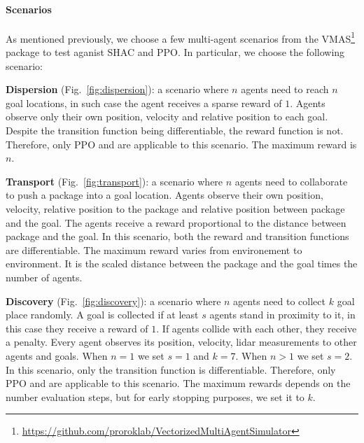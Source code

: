 \paragraph{Scenarios}
As mentioned previously, we choose a few multi-agent scenarios from the VMAS\footnote{\url{https://github.com/proroklab/VectorizedMultiAgentSimulator}} package to test \fname{} aganist SHAC and PPO. In particular, we choose the following scenario:
\begin{compactitem}
    \item \textbf{Dispersion} (Fig.~\ref{fig:dispersion}): 
         a scenario where $n$ agents need to reach $n$ goal locations, in such case the agent receives a sparse reward of $1$. Agents observe only their own position, velocity and relative position to each goal. 
         Despite the transition function being differentiable, the reward function is not. Therefore, only PPO and \fname{} are applicable to this scenario. 
         The maximum reward is $n$.
    \item \textbf{Transport} (Fig.~\ref{fig:transport}): 
         a scenario where $n$ agents need to collaborate to push a package into a goal location. Agents observe their own position, velocity, relative position to the package and relative position between package and the goal. The agents receive a reward proportional to the distance between package and the goal. 
         In this scenario, both the reward and transition functions are differentiable. 
         The maximum reward varies from environement to environment. It is the scaled distance between the package and the goal times the number of agents.
    \item \textbf{Discovery} (Fig.~\ref{fig:discovery}): 
         a scenario where $n$ agents need to collect $k$ goal place randomly. A goal is collected if at least $s$ agents stand in proximity to it, in this case they receive a reward of $1$. If agents collide with each other, they receive a penalty. Every agent observes its position, velocity, lidar measurements to other agents and goals. When $n=1$ we set $s=1$ and $k=7$. When $n>1$ we set $s=2$.
         In this scenario, only the transition function is differentiable. Therefore, only PPO and \fname{} are applicable to this scenario. 
         The maximum rewards depends on the number evaluation steps, but for early stopping purposes, we set it to $k$. 

\end{compactitem}
